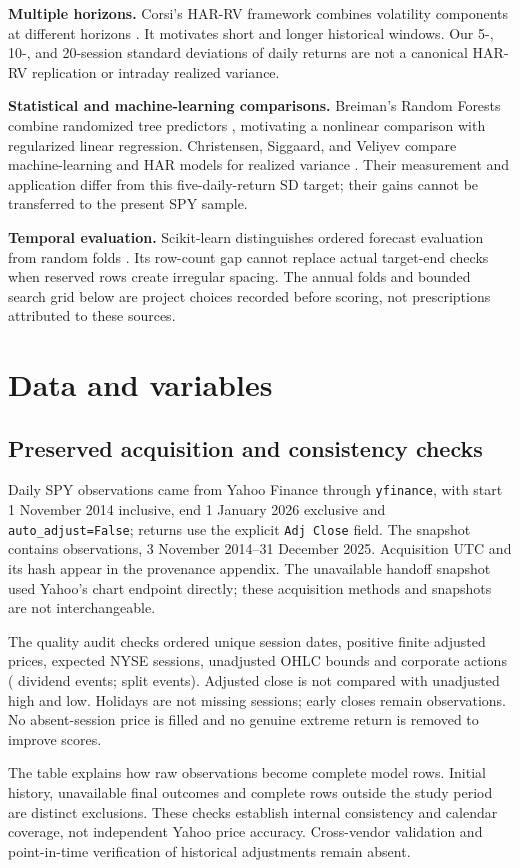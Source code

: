 \documentclass[10pt,letterpaper]{article}
\newcommand{\code}[1]{\texttt{\small #1}}\newcommand{\sd}{\operatorname{sd}}
\begin{document}
\textbf{Multiple horizons.} Corsi's HAR-RV framework combines volatility
components at different horizons \cite{corsi}. It motivates short and longer
historical windows. Our 5-, 10-, and 20-session standard deviations of daily
returns are not a canonical HAR-RV replication or intraday realized variance.

\textbf{Statistical and machine-learning comparisons.} Breiman's Random Forests
combine randomized tree predictors \cite{breiman}, motivating a nonlinear
comparison with regularized linear regression. Christensen, Siggaard, and Veliyev
compare machine-learning and HAR models for realized variance \cite{christensen}.
Their measurement and application differ from this five-daily-return SD target;
their gains cannot be transferred to the present SPY sample.

\textbf{Temporal evaluation.} Scikit-learn distinguishes ordered forecast
evaluation from random folds \cite{cv,temporal_api}. Its row-count gap cannot
replace actual target-end checks when reserved rows create irregular spacing.
The annual folds and bounded search grid below are project choices recorded
before scoring, not prescriptions attributed to these sources.

\clearpage\section{Data and variables}
\subsection{Preserved acquisition and consistency checks}
Daily SPY observations came from Yahoo Finance through \code{yfinance}, with
start 1 November 2014 inclusive, end 1 January 2026 exclusive and
\code{auto\_adjust=False}; returns use the explicit \code{Adj Close} field.
The snapshot contains \RawCount{} observations, 3 November 2014--31 December
2025. Acquisition UTC and its hash appear in the provenance appendix. The
unavailable handoff snapshot used Yahoo's chart endpoint directly; these
acquisition methods and snapshots are not interchangeable.

The quality audit checks ordered unique session dates, positive finite adjusted
prices, expected NYSE sessions, unadjusted OHLC bounds and corporate actions
(\DividendCount{} dividend events; \SplitCount{} split events). Adjusted close
is not compared with unadjusted high and low. Holidays are not missing sessions;
early closes remain observations. No absent-session price is filled and no
genuine extreme return is removed to improve scores.
\begin{center}\end{center}
The table explains how raw observations become complete model rows. Initial
history, unavailable final outcomes and complete rows outside the study period
are distinct exclusions. These checks establish internal consistency and calendar
coverage, not independent Yahoo price accuracy. Cross-vendor validation and
point-in-time verification of historical adjustments remain absent.
\end{document}
